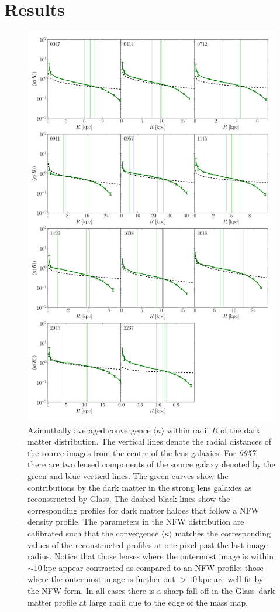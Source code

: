 \documentclass[useAMS,usenatbib]{mn2e}
\def\Glass{{\sc Glass}}
\begin{document}
\section{Results}\label{sec:results}
\begin{figure}
  \centering
  \includegraphics[width=.7\linewidth]{Figures/kappaplot.pdf}
  \caption[width=\linewidth]{Azimuthally averaged convergence $\langle\kappa\rangle$ within radii $R$ of the dark matter distribution. The vertical lines denote the radial distances of the source images from the centre of the lens galaxies. For \textit{0957}, there are two lensed components of the source galaxy denoted by the green and blue vertical lines. The green curves show the contributions by the dark matter in the strong lens galaxies as reconstructed by \Glass. The dashed black lines show the corresponding profiles for dark matter haloes that follow a NFW density profile. The parameters in the NFW distribution are calibrated such that the convergence $\langle\kappa\rangle$ matches the corresponding values of the reconstructed profiles at one pixel past the last image radius. Notice that those lenses where the outermost image is within $\sim 10$\,kpc appear contracted as compared to an NFW profile; those where the outermost image is further out $> 10$\,kpc are well fit by the NFW form. In all cases there is a sharp fall off in the \Glass\ dark matter profile at large radii due to the edge of the mass map.}
  \label{fig:kappaplot}
\end{figure}
\end{document}
